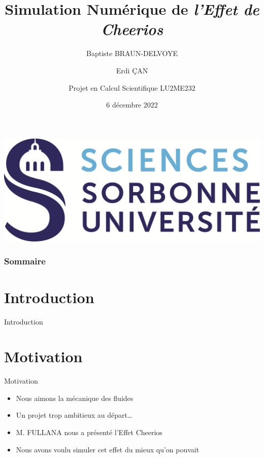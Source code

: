 \documentclass[aspectratio=169,xcolor=dvipsnames]{beamer}
\title[Simulation Numérique de \textit{l'Effet de Cheerios}]{Simulation Numérique de \textit{l'Effet de Cheerios}}
\author[Nous] {Baptiste BRAUN-DELVOYE\\\and Erdi ÇAN \\\and Projet en Calcul Scientifique LU2ME232}
\date{6 décembre 2022} %
\institute{Sorbonne Université, CMI Mécanique}
\begin{document}
\usetikzlibrary{patterns,patterns.meta}
{
\begin{frame}
    \titlepage
    \centering
    \includegraphics[scale=.2]{SORBONNE_FAC_SCIENCES_DEF_CMJN.png}
\end{frame}
}

\begin{frame}
    \frametitle{Sommaire}
    \tableofcontents
\end{frame}

\section{Introduction}
\begin{frame}{Introduction}%
    \begin{center}
    \end{center}
\end{frame}

\section{Motivation}
\begin{frame}{Motivation}
    \begin{itemize}
        \item Nous aimons la mécanique des fluides
        \item Un projet trop ambitieux au départ\dots
        \item M. FULLANA nous a présenté l'Effet Cheerios
        \item Nous avons voulu simuler cet effet du mieux qu'on pouvait
    \end{itemize}
\end{frame}
\end{document}
